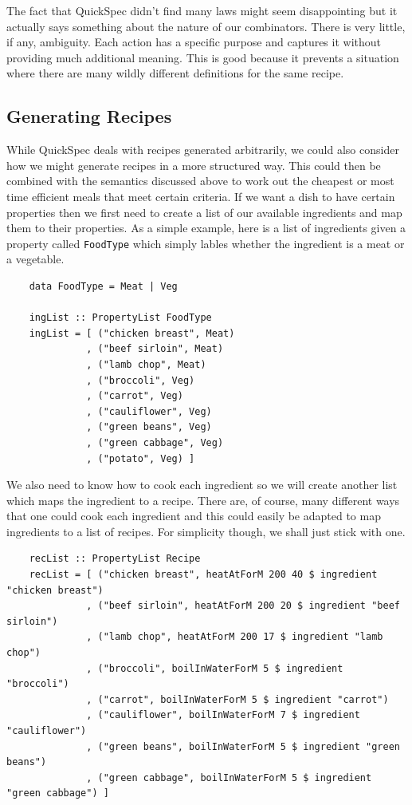 \documentclass[11pt]{article}
\begin{document}
\medbreak

The fact that QuickSpec didn't find many laws might seem disappointing but it
actually says something about the nature of our combinators. There is very
little, if any, ambiguity. Each action has a specific purpose and captures
it without providing much additional meaning. This is good because it prevents
a situation where there are many wildly different definitions for the same recipe.

\subsection{Generating Recipes}

While QuickSpec deals with recipes generated arbitrarily, we could also
consider how we might generate recipes in a more structured way. This could
then be combined with the semantics discussed above to work out the cheapest
or most time efficient meals that meet certain criteria. If we want a dish
to have certain properties then we first need to create a list of our
available ingredients and map them to their properties. As a simple
example, here is a list of ingredients given a property called
\texttt{FoodType} which simply lables whether the ingredient is a meat
or a vegetable.

\begin{lstlisting}
    data FoodType = Meat | Veg

    ingList :: PropertyList FoodType
    ingList = [ ("chicken breast", Meat)
              , ("beef sirloin", Meat)
              , ("lamb chop", Meat)
              , ("broccoli", Veg)
              , ("carrot", Veg)
              , ("cauliflower", Veg)
              , ("green beans", Veg)
              , ("green cabbage", Veg)
              , ("potato", Veg) ]
\end{lstlisting}

We also need to know how to cook each ingredient so we will create another
list which maps the ingredient to a recipe. There are, of course, many different
ways that one could cook each ingredient and this could easily be adapted to
map ingredients to a list of recipes. For simplicity though, we shall just
stick with one.

\begin{lstlisting}
    recList :: PropertyList Recipe
    recList = [ ("chicken breast", heatAtForM 200 40 $ ingredient "chicken breast")
              , ("beef sirloin", heatAtForM 200 20 $ ingredient "beef sirloin")
              , ("lamb chop", heatAtForM 200 17 $ ingredient "lamb chop")
              , ("broccoli", boilInWaterForM 5 $ ingredient "broccoli")
              , ("carrot", boilInWaterForM 5 $ ingredient "carrot")
              , ("cauliflower", boilInWaterForM 7 $ ingredient "cauliflower")
              , ("green beans", boilInWaterForM 5 $ ingredient "green beans")
              , ("green cabbage", boilInWaterForM 5 $ ingredient "green cabbage") ]
\end{lstlisting}
\end{document}
